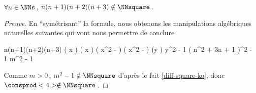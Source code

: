 \begin{fact} \label{case-4}
	 $\forall n \in \NNs$\,, $n(n+1)(n+2)(n+3) \notin \NNsquare$\,.
\end{fact}




\begin{proof}[Preuve]
	En \enquote{symétrisant} la formule, nous obtenons les manipulations algébriques naturelles suivantes qui vont nous permettre de conclure
    
    \medskip
    
    \begin{stepcalc}[style = sar]
    \explnext{}
    	n(n+1)(n+2)(n+3)
    	\big( x \pm {} \big) \big( x \pm {} \big)
    \explnext{}
    	\big( x^2 -  \big) \big( x^2 -  \big)
    	(y )
    \explnext{}
    	y^2 - 1
    	\big( n^2 + 3n + 1 \big)^2 - 1
    	m^2 - 1
    \end{stepcalc}
    
    \medskip
    
    Comme $m > 0$\,, $m^2 - 1 \notin \NNsquare$ d'après le fait \ref{diff-square-ko}, donc $\consprod<4> \notin \NNsquare$\,. 
\end{proof}


